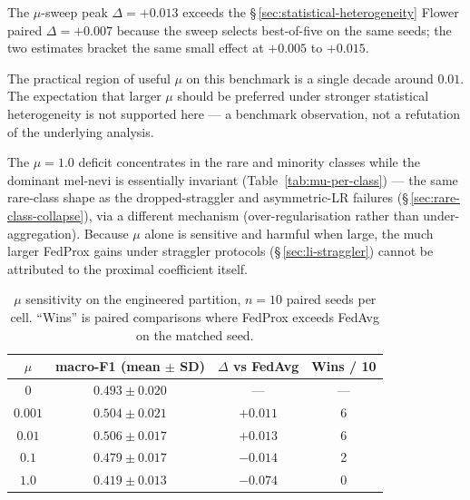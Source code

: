 \documentclass[11pt,a4paper]{report}
\begin{document}
The $\mu$-sweep peak $\Delta = +0.013$ exceeds the
\S\,\ref{sec:statistical-heterogeneity} Flower paired $\Delta = +0.007$
because the sweep selects best-of-five on the same seeds; the two estimates
bracket the same small effect at $+0.005$ to $+0.015$.

The practical region of useful $\mu$ on this benchmark is a single decade
around $0.01$. The expectation that larger $\mu$ should be preferred under
stronger statistical heterogeneity is not supported here --- a benchmark
observation, not a refutation of the underlying analysis.

The $\mu = 1.0$ deficit concentrates in the rare and minority classes while the
dominant mel-nevi is essentially invariant (Table~\ref{tab:mu-per-class}) --- the
same rare-class shape as the dropped-straggler and asymmetric-LR failures
(\S\,\ref{sec:rare-class-collapse}), via a different mechanism
(over-regularisation rather than under-aggregation). Because $\mu$ alone is
sensitive and harmful when large, the much larger FedProx gains under straggler
protocols (\S\,\ref{sec:li-straggler}) cannot be attributed to the proximal
coefficient itself.



\begin{table}[H]
\centering
\caption{$\mu$ sensitivity on the engineered partition, $n=10$ paired
seeds per cell. ``Wins'' is paired comparisons where FedProx exceeds
FedAvg on the matched seed.}
\label{tab:mu-sweep}
\begin{tabular}{cccc}
\hline
$\mu$    & macro-F1 (mean $\pm$ SD)   & $\Delta$ vs FedAvg & Wins / 10 \\
\hline
$0$      & $0.493 \pm 0.020$          & ---               & ---  \\
$0.001$  & $0.504 \pm 0.021$          & $+0.011$          & 6    \\
$0.01$   & $\mathbf{0.506 \pm 0.017}$ & $\mathbf{+0.013}$ & 6    \\
$0.1$    & $0.479 \pm 0.017$          & $-0.014$          & 2    \\
$1.0$    & $0.419 \pm 0.013$          & $-0.074$          & 0    \\
\hline
\end{tabular}
\end{table}


\end{document}
